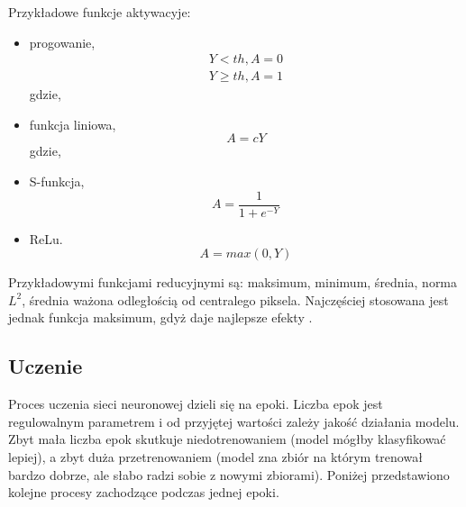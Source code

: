 Przykładowe funkcje aktywacyje:
\begin{itemize}
\item progowanie,
\begin{equation}
\begin{aligned}
Y < th, A = 0\\
Y \geq th, A = 1
\end{aligned}
\end{equation}
gdzie,
\item funkcja liniowa,
\begin{equation}
A = cY
\end{equation}
gdzie,
\item S-funkcja,
\begin{equation}
A = \frac{1}{1+e^{-Y}}
\end{equation}
\item ReLu.
\begin{equation}
A = max(0,Y)
\end{equation}
\end{itemize}

Przykładowymi funkcjami reducyjnymi są: maksimum, minimum, średnia, norma \begin{math}L^{2}\end{math}, średnia ważona odległością od centralego piksela. Najczęściej stosowana jest jednak funkcja maksimum, gdyż daje najlepsze efekty \cite{Scherer2010EvaluationOP}.


\subsection{Uczenie}
Proces uczenia sieci neuronowej dzieli się na epoki. Liczba epok jest regulowalnym parametrem i od przyjętej wartości zależy jakość działania modelu. Zbyt mała liczba epok skutkuje niedotrenowaniem (model mógłby klasyfikować lepiej), a zbyt duża przetrenowaniem (model zna zbiór na którym trenował bardzo dobrze, ale słabo radzi sobie z nowymi zbiorami). Poniżej przedstawiono kolejne procesy zachodzące podczas jednej epoki.

